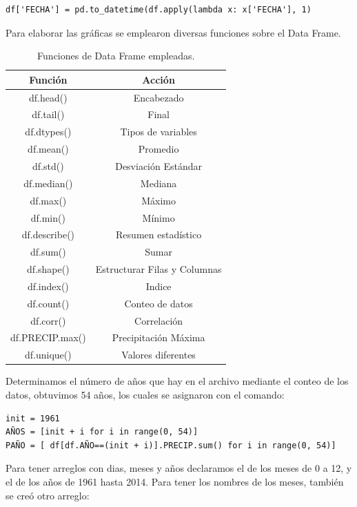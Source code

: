 \documentclass[12pt]{article}
\begin{document}
\begin{center}
\begin{verbatim}
df['FECHA'] = pd.to_datetime(df.apply(lambda x: x['FECHA'], 1)
    \end{verbatim}
\end{center}
Para elaborar las gráficas se emplearon diversas funciones sobre el Data Frame.\\
\begin{table}[]
\centering
\caption{Funciones de Data Frame empleadas.}
\begin{tabular}{|c|c|}
\hline
Función         & Acción              \\ \hline
df.head()       & Encabezado          \\ \hline
df.tail()       & Final               \\ \hline
df.dtypes()     & Tipos de variables  \\ \hline
df.mean()       & Promedio            \\ \hline
df.std()        & Desviación Estándar \\ \hline
df.median()     & Mediana             \\ \hline
df.max()        & Máximo              \\ \hline
df.min()        & Mínimo              \\ \hline
df.describe()   & Resumen estadístico \\ \hline
df.sum()         & Sumar           \\ \hline
df.shape()      & Estructurar Filas y Columnas    \\ \hline
df.index()     &  Indice     \\ \hline
df.count()     & Conteo de datos     \\ \hline
df.corr()       & Correlación       \\ \hline
df.PRECIP.max()        & Precipitación Máxima            \\ \hline
df.unique()     & Valores diferentes  \\ \hline
\end{tabular}
\end{table}Determinamos el número de años que hay en el archivo mediante el conteo de los datos, obtuvimos 54 años, los cuales se asignaron con el comando:
\begin{center}
\begin{verbatim}
init = 1961
AÑOS = [init + i for i in range(0, 54)]
PAÑO = [ df[df.AÑO==(init + i)].PRECIP.sum() for i in range(0, 54)]
    \end{verbatim}
\end{center} Para tener arreglos con dias, meses y años declaramos el de los meses de 0 a 12, y el de los años de 1961 hasta 2014. Para tener los nombres de los meses, también se creó otro arreglo:
\end{document}

